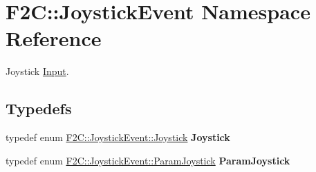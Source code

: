 \hypertarget{namespace_f2_c_1_1_joystick_event}{
\section{F2C::JoystickEvent Namespace Reference}
\label{namespace_f2_c_1_1_joystick_event}
}


Joystick \hyperlink{class_f2_c_1_1_input}{Input}.  


\subsection*{Typedefs}
\begin{DoxyCompactItemize}
\item 
\hypertarget{namespace_f2_c_1_1_joystick_event_acfd8b0f0097f52b3e36b028b60bcb590}{
typedef enum \hyperlink{namespace_f2_c_1_1_joystick_event_ada0230f460f765718db17ac021cbfc1f}{F2C::JoystickEvent::Joystick} {\bfseries Joystick}}
\label{namespace_f2_c_1_1_joystick_event_acfd8b0f0097f52b3e36b028b60bcb590}

\item 
\hypertarget{namespace_f2_c_1_1_joystick_event_ace1d8e24820be9db85fcb96bdeb4394f}{
typedef enum \hyperlink{namespace_f2_c_1_1_joystick_event_ae71fc0f92f6dd24cc1ffe1bd14b6ed82}{F2C::JoystickEvent::ParamJoystick} {\bfseries ParamJoystick}}
\label{namespace_f2_c_1_1_joystick_event_ace1d8e24820be9db85fcb96bdeb4394f}

\end{DoxyCompactItemize}
